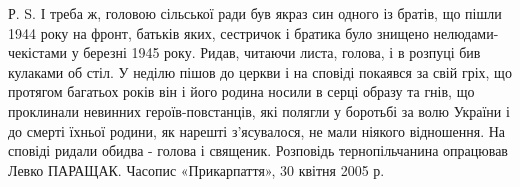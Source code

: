 Р. S. І треба ж, головою сільської ради був якраз син одного із братів, що
пішли 1944 року на фронт, батьків яких, сестричок і братика було знищено
нелюдами-чекістами у березні 1945 року. Ридав, читаючи листа, голова, і в
розпуці бив кулаками об стіл. У неділю пішов до церкви і на сповіді покаявся за
свій гріх, що протягом багатьох років він і його родина носили в серці образу
та гнів, що проклинали невинних героїв-повстанців, які полягли у боротьбі за
волю України і до смерті їхньої родини, як нарешті з’ясувалося, не мали ніякого
відношення. На сповіді ридали обидва - голова і священик. Розповідь
тернопільчанина опрацював Левко ПАРАЩАК. Часопис «Прикарпаття», 30 квітня 2005
р.
